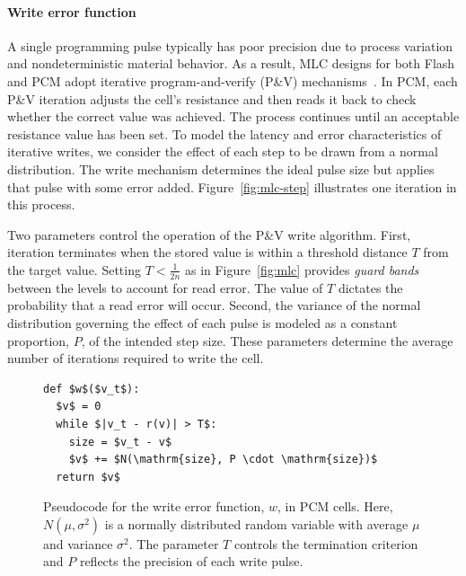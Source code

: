 \documentclass[prodmode,acmtocs]{acmsmall}
\begin{document}
\paragraph{Write error function}

A single programming pulse typically has poor
precision due to process variation and nondeterministic material
behavior. As a result, MLC designs for both Flash and PCM adopt iterative
program-and-verify (P\&V) mechanisms~\cite{morphablepcm,mlcflash}.
In PCM, each P\&V iteration adjusts the cell's resistance and then reads it
back to check whether the
correct value was achieved.
The process continues until an acceptable resistance value has been set.
To model the latency and error characteristics of iterative writes, we
consider the effect of each step to be drawn from a normal
distribution. The write mechanism determines the ideal pulse size but
applies that pulse with some error added.
Figure~\ref{fig:mlc-step} illustrates one iteration in this process.

Two parameters control the operation of the P\&V write algorithm.
First, iteration terminates when the stored value is within a
threshold distance $T$ from the target value. 
Setting $T < \frac{1}{2n}$ as in Figure~\ref{fig:mlc} provides \emph{guard bands} between the
levels to account for read error. The value of $T$ dictates the probability
that a read error will occur.
Second, the variance of
the normal distribution governing the effect of each pulse is modeled
as a constant proportion, $P$, of the intended step size. These parameters
determine the average number of iterations required to write the cell.

\begin{figure}
    \begin{center}
    \begin{minipage}{2in}
    \begin{lstlisting}[mathescape]
def $w$($v_t$):
  $v$ = 0
  while $|v_t - r(v)| > T$:
    size = $v_t - v$
    $v$ += $N(\mathrm{size}, P \cdot \mathrm{size})$
  return $v$
\end{lstlisting}
    \end{minipage}
    \end{center}
    \caption{
        Pseudocode for the write error function, $w$, in PCM
        cells.
        Here, $N(\mu, \sigma^2)$ is a normally distributed random
        variable
        with average $\mu$ and variance
        $\sigma^2$. The parameter $T$ controls the termination
        criterion and $P$ reflects the precision of each write pulse.
    }
    \label{fig:pcode-pcm}
\end{figure}
\end{document}
